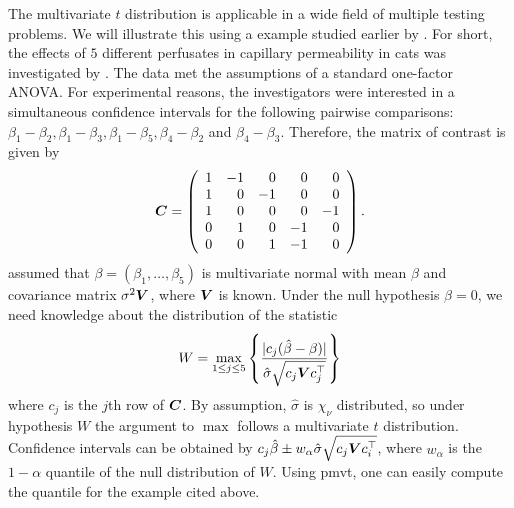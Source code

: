 \documentclass[11pt]{amsart}
\newcommand{\C}{\mbox{\boldmath $C$}}
\newcommand{\V}{\mbox{\boldmath $V$}}
\begin{document}
The multivariate $t$ distribution is applicable in a wide field
of multiple testing problems. We will illustrate this using a
example studied earlier by \cite{the-effici:1987}. For short, the
effects of $5$ different perfusates in capillary permeability in
cats was investigated by \cite{blood-and-:1987}. The data met the
assumptions of a standard one-factor ANOVA. For experimental
reasons, the investigators were interested in a simultaneous
confidence intervals for the following pairwise comparisons: $
\beta_1 - \beta_2, \beta_1 - \beta_3, \beta_1 - \beta_5, \beta_4
- \beta_2 $ and $ \beta_4 - \beta_3 $. Therefore, the matrix of
contrast is given by
\begin{eqnarray*}
\C = \left( \begin{array}{rrrrr} 1 & -1 & 0 & 0 & 0 \\
1 & 0 & -1 & 0 & 0 \\
1 & 0 & 0 & 0 & -1 \\
0 & 1 & 0 & -1 & 0 \\
0 & 0 & 1 & -1 & 0 \end{array} \right) .
\end{eqnarray*}
\cite{the-effici:1987} assumed that $ \beta = (\beta_1, \dots, \beta_5) $ is
multivariate normal with mean $ \beta $ and covariance matrix $ \sigma^2 \V
$, where $ \V $ is known. Under the null hypothesis $ \beta = 0 $, we need
knowledge about the
distribution of the statistic
\begin{eqnarray*}
W = \max_{1 \le j \le 5} \left\{ \frac{| c_j(\hat{\beta} - \beta)
|}{\hat{\sigma}\sqrt{c_j \V c_j^{\top}}} \right\}
\end{eqnarray*}
where $ c_j $ is the $j$th row of $ \C $. By assumption,
$\hat{\sigma}$ is $ \chi_\nu $ distributed, so under hypothesis $
W $ the argument to $ \max $ follows a multivariate $ t $
distribution. Confidence intervals can be obtained by $ c_j
\hat{\beta} \pm w_\alpha \hat{\sigma} \sqrt{c_j \V c_i^\top} $,
where $ w_\alpha $ is the $ 1 - \alpha $ quantile of the null
distribution of $ W $. Using {\ttfamily pmvt}, one can easily
compute the quantile for the example cited above.
\end{document}
